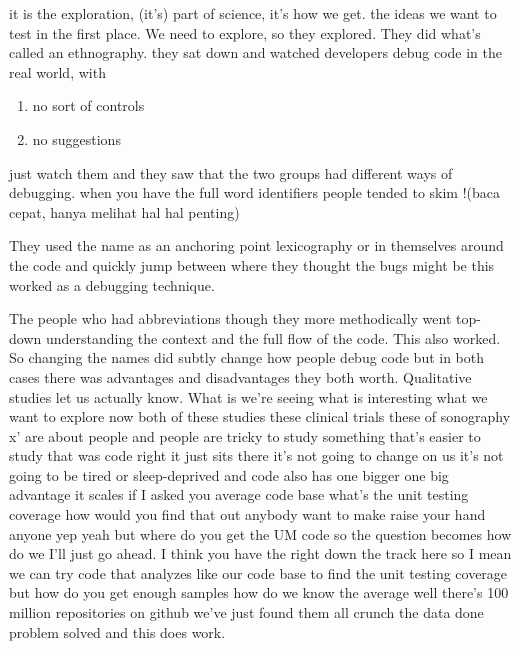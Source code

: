 \documentclass[conference, compsoc, twoside]{IEEEtran}
\begin{document}
it is the exploration, (it's) part of science, it’s how we get. 
the ideas we want to test in the first place.
We need to explore, so they explored. 
They did what’s called an ethnography.
they sat down and watched developers debug code in the real world, with 
\begin{enumerate}
\item no sort of controls
\item no suggestions 
\end{enumerate}
just watch them and they saw that the two groups had different ways of debugging.
when you have the full word identifiers
people tended to skim !(baca cepat, hanya melihat hal hal penting) 

They used the name as an anchoring point lexicography or in themselves around the code and
quickly jump between where they thought the bugs might be this worked as a debugging technique.
 
The people who had abbreviations though they more methodically went top-down understanding the context and the full flow of the code. This also worked. So changing the names did subtly change how people debug code but in both cases there was advantages and disadvantages they both worth. 
Qualitative studies let us actually know.
What is we're seeing what is interesting what we want to explore
now both of these studies these clinical
trials these of sonography x' are about
people and people are tricky to study
something that's easier to study that
was code right it just sits there it's
not going to change on us it's not going
to be tired or sleep-deprived and code
also has one bigger one big advantage it
scales if I asked you average code base
what's the unit testing coverage how
would you find that out anybody want to
make raise your hand anyone yep yeah but
where do you get the UM code so the
question becomes how do we I'll just go
ahead.
I think you have the right down the track here so I mean we can try code
that analyzes like our code base to find
the unit testing coverage but how do you
get enough samples how do we know the
average well there's 100 million
repositories on github we've just found
them all crunch the data done problem solved and this does work.
\end{document}
